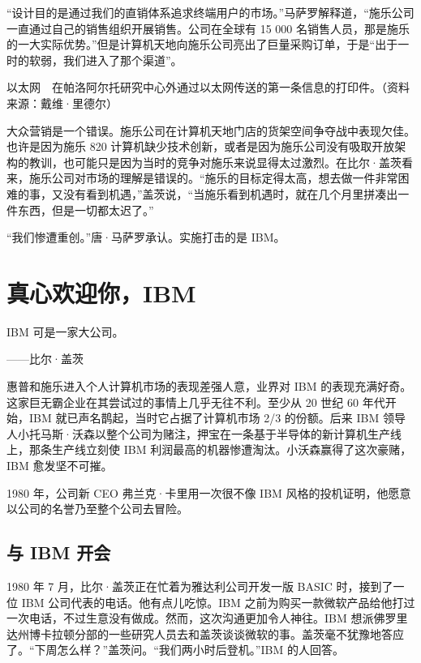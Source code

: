 \documentclass[12pt,UTF8]{ctexbook}
\begin{document}
“设计目的是通过我们的直销体系追求终端用户的市场。”马萨罗解释道，“施乐公司一直通过自己的销售组织开展销售。公司在全球有 15 000 名销售人员，那是施乐的一大实际优势。”但是计算机天地向施乐公司亮出了巨量采购订单，于是“出于一时的软弱，我们进入了那个渠道”。



以太网　在帕洛阿尔托研究中心外通过以太网传送的第一条信息的打印件。（资料来源：戴维·里德尔）

大众营销是一个错误。施乐公司在计算机天地门店的货架空间争夺战中表现欠佳。也许是因为施乐 820 计算机缺少技术创新，或者是因为施乐公司没有吸取开放架构的教训，也可能只是因为当时的竞争对施乐来说显得太过激烈。在比尔·盖茨看来，施乐公司对市场的理解是错误的。“施乐的目标定得太高，想去做一件非常困难的事，又没有看到机遇，”盖茨说，“当施乐看到机遇时，就在几个月里拼凑出一件东西，但是一切都太迟了。”

“我们惨遭重创。”唐·马萨罗承认。实施打击的是 IBM。





\section{真心欢迎你，IBM}


IBM 可是一家大公司。

——比尔·盖茨



惠普和施乐进入个人计算机市场的表现差强人意，业界对 IBM 的表现充满好奇。这家巨无霸企业在其尝试过的事情上几乎无往不利。至少从 20 世纪 60 年代开始，IBM 就已声名鹊起，当时它占据了计算机市场 2/3 的份额。后来 IBM 领导人小托马斯·沃森以整个公司为赌注，押宝在一条基于半导体的新计算机生产线上，那条生产线立刻使 IBM 利润最高的机器惨遭淘汰。小沃森赢得了这次豪赌，IBM 愈发坚不可摧。

1980 年，公司新 CEO 弗兰克·卡里用一次很不像 IBM 风格的投机证明，他愿意以公司的名誉乃至整个公司去冒险。





\subsection{与 IBM 开会}


1980 年 7 月，比尔·盖茨正在忙着为雅达利公司开发一版 BASIC 时，接到了一位 IBM 公司代表的电话。他有点儿吃惊。IBM 之前为购买一款微软产品给他打过一次电话，不过生意没有做成。然而，这次沟通更加令人神往。IBM 想派佛罗里达州博卡拉顿分部的一些研究人员去和盖茨谈谈微软的事。盖茨毫不犹豫地答应了。“下周怎么样？”盖茨问。“我们两小时后登机。”IBM 的人回答。
\end{document}
